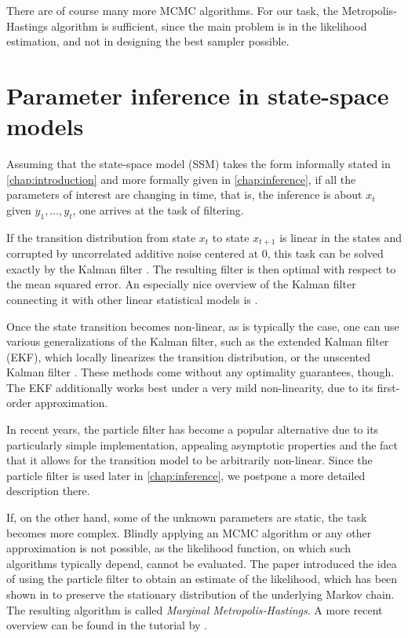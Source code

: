 There are of course many more MCMC algorithms. For our task, the Metropolis-Hastings algorithm is sufficient, since the main problem is in the likelihood estimation, and not in designing the best sampler possible.

\section{Parameter inference in state-space models}
Assuming that the state-space model (SSM) takes the form informally stated in \autoref{chap:introduction} and more formally given in \autoref{chap:inference}, if all the parameters of interest are changing in time, that is, the inference is about $x_t$ given $y_1, \ldots, y_t$, one arrives at the task of filtering.

If the transition distribution from state $x_t$ to state $x_{t+1}$ is linear in the states and corrupted by uncorrelated additive noise centered at 0, this task can be solved exactly by the Kalman filter \citep{kalman}. The resulting filter is then optimal with respect to the mean squared error. An especially nice overview of the Kalman filter connecting it with other linear statistical models is \cite{lds}.

Once the state transition becomes non-linear, as is typically the case, one can use various generalizations of the Kalman filter, such as the extended Kalman filter (EKF), which locally linearizes the transition distribution, or the unscented Kalman filter \citep{ukf}. These methods come without any optimality guarantees, though. The EKF additionally works best under a very mild non-linearity, due to its first-order approximation.

In recent years, the particle filter \citep{particle-filter} has become a popular alternative due to its particularly simple implementation, appealing asymptotic properties and the fact that it allows for the transition model to be arbitrarily non-linear. Since the particle filter is used later in \autoref{chap:inference}, we postpone a more detailed description there.

If, on the other hand, some of the unknown parameters are static, the task becomes more complex. Blindly applying an MCMC algorithm or any other approximation is not possible, as the likelihood function, on which such algorithms typically depend, cannot be evaluated. The paper \cite{andrieu} introduced the idea of using the particle filter to obtain an estimate of the likelihood, which has been shown in \cite{del-moral} to preserve the stationary distribution of the underlying Markov chain. The resulting algorithm is called \textit{Marginal Metropolis-Hastings}. A more recent overview can be found in the tutorial by \cite{schoen}.

